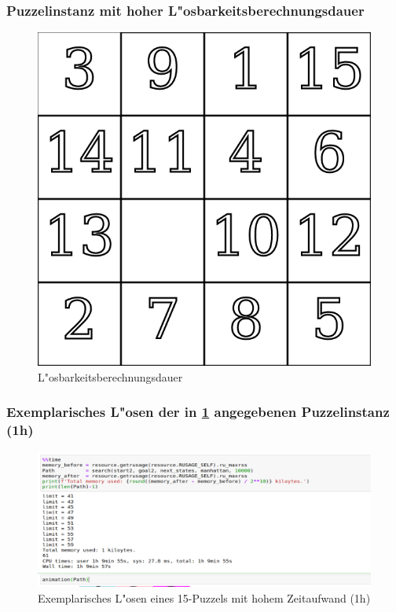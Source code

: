 \subsubsection{Puzzelinstanz mit hoher L"osbarkeitsberechnungsdauer}
\begin{figure}[H]
    \centering
    \includegraphics[width=0.5\linewidth,keepaspectratio]{img/time_consuming_puzzle_instance.png}
    \captionsetup{format=plain, indention=0pt}
    \caption{L"osbarkeitsberechnungsdauer \label{app:fig:time_c_p_i}}
\end{figure}

\subsubsection{Exemplarisches L"osen der in \ref{app:fig:time_c_p_i} angegebenen Puzzelinstanz (1h)}
\begin{figure}[H]
    \centering
    \includegraphics[width=\linewidth,keepaspectratio]{img/1h_solving_time_15_puzzle.png}
    \captionsetup{format=plain, indention=0pt}
    \caption{Exemplarisches L"osen eines 15-Puzzels mit hohem Zeitaufwand (1h) \label{app:fig:1h}}
\end{figure}